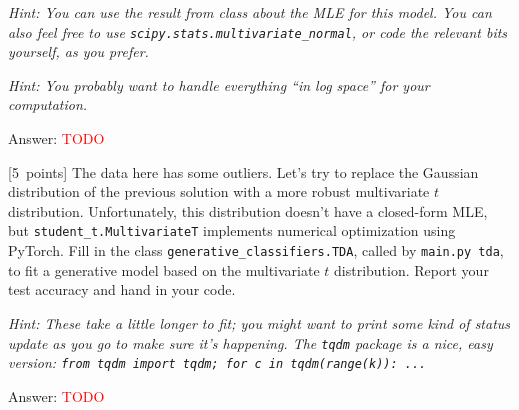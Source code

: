 \documentclass{article}
\newcommand{\ask}[1]{\textcolor{question}{#1}}
\newenvironment{answer}{\par\begingroup\color{answer}Answer: }{\endgroup}
\newcommand{\red}[1]{\textcolor{red}{#1}}
\newcommand{\pts}[1]{\textcolor{points}{[#1~points]}}
\newcommand{\hint}[1]{\textcolor{black!60!white}{\emph{Hint: #1}}}
\newcommand{\TODO}{\red{TODO}}
\begin{document}
\begin{qlist}
    \hint{You can use the result from class about the MLE for this model. You can also feel free to use \texttt{scipy.stats.multivariate\_normal}, or code the relevant bits yourself, as you prefer.}

    \hint{You probably want to handle everything ``in log space'' for your computation.}

\begin{answer}\TODO\end{answer}

\item \pts{5}
    The data here has some outliers.
    Let's try to replace the Gaussian distribution of the previous solution with a more robust multivariate $t$ distribution.
    Unfortunately, this distribution doesn't have a closed-form MLE,
    but \texttt{student\_t.MultivariateT} implements numerical optimization using PyTorch.
    Fill in the class \texttt{generative\_classifiers.TDA},
    called by \texttt{main.py tda},
    to fit a generative model based on the multivariate $t$ distribution.
    \ask{Report your test accuracy and hand in your code.}

    \hint{These take a little longer to fit; you might want to print some kind of status update as you go to make sure it's happening. The \texttt{tqdm} package is a nice, easy version: \texttt{from tqdm import tqdm; for c in tqdm(range(k)): ...}}

\begin{answer}\TODO\end{answer}
\end{qlist}
\end{document}
